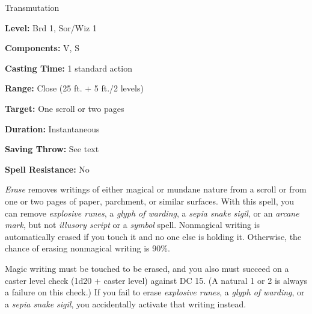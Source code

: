 
Transmutation

\textbf{Level:} Brd 1, Sor/Wiz 1

\textbf{Components:} V, S

\textbf{Casting Time:} 1 standard action

\textbf{Range:} Close (25 ft. + 5 ft./2 levels)

\textbf{Target:} One scroll or two pages

\textbf{Duration:} Instantaneous

\textbf{Saving Throw:} See text

\textbf{Spell Resistance:} No

\textit{Erase} removes writings of either magical or mundane nature from a scroll 
or from one or two pages of paper, parchment, or similar surfaces. With this spell, 
you can remove \textit{explosive runes}, a \textit{glyph of warding}, a \textit{sepia 
snake sigil}, or an \textit{arcane mark}, but not \textit{illusory script} or a 
\textit{symbol} spell. Nonmagical writing is automatically erased if you touch 
it and no one else is holding it. Otherwise, the chance of erasing nonmagical writing 
is 90\%.

Magic writing must be touched to be erased, and you also must succeed on a caster 
level check (1d20 + caster level) against DC 15. (A natural 1 or 2 is always a 
failure on this check.) If you fail to erase \textit{explosive runes}, a \textit{glyph 
of warding}, or a \textit{sepia snake sigil}, you accidentally activate that writing 
instead.

